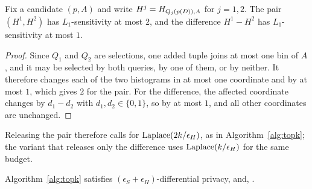 \begin{proposition}
\label{prop:histogram-release-sensitivity}
Fix a candidate $(p,A)$ and write $H^j=H_{Q_j(p(D)),A}$ for $j=1,2$.
The pair $(H^1,H^2)$ has $L_1$-sensitivity at most $2$, and the difference $H^1-H^2$ has $L_1$-sensitivity at most $1$.
\end{proposition}

\begin{proof}
Since $Q_1$ and $Q_2$ are selections, one added tuple joins at most one bin of $A$, and it may be selected by both queries, by one of them, or by neither.
It therefore changes each of the two histograms in at most one coordinate and by at most $1$, which gives $2$ for the pair.
For the difference, the affected coordinate changes by $d_1-d_2$ with $d_1,d_2\in\{0,1\}$, so by at most $1$, and all other coordinates are unchanged.
\end{proof}

Releasing the pair therefore calls for $\operatorname{Laplace}(2k/\epsilon_H)$, as in Algorithm~\ref{alg:topk}; the variant that releases only the difference uses $\operatorname{Laplace}(k/\epsilon_H)$ for the same budget.

\begin{proposition}
\label{prop:framework-dp}
Algorithm~\ref{alg:topk} satisfies $(\epsilon_S+\epsilon_H)$-differential privacy, and, .
\end{proposition}

